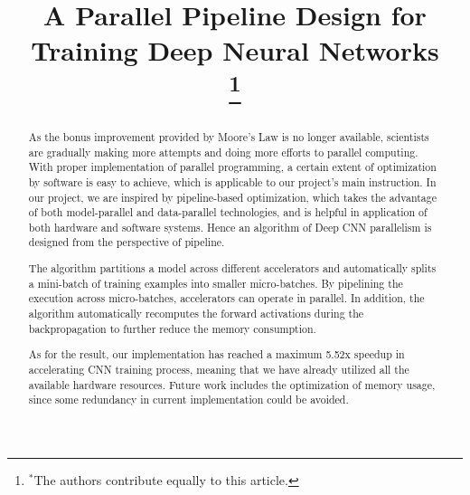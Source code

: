 \documentclass[conference]{IEEEtran}
\begin{document}
\title{A Parallel Pipeline Design for Training Deep Neural Networks\\
\thanks{$^*$The authors contribute equally to this article.}
}

\author{
\and
{}
}

\maketitle

\begin{abstract}
As the bonus improvement provided by Moore’s Law is no longer available, scientists are gradually making more attempts and doing more efforts to parallel computing. With proper implementation of parallel programming, a certain extent of optimization by software is easy to achieve, which is applicable to our project's main instruction. In our project, we are inspired by pipeline-based optimization, which takes the advantage of both model-parallel and data-parallel technologies, and is helpful in application of both hardware and software systems. Hence an algorithm of Deep CNN parallelism is designed from the perspective of pipeline.

The algorithm partitions a model across different accelerators and automatically splits a mini-batch of training examples into smaller micro-batches. By pipelining the execution across micro-batches, accelerators can operate in parallel. In addition, the algorithm automatically recomputes the forward activations during the backpropagation to further reduce the memory consumption.

As for the result, our implementation has reached a maximum 5.52x speedup in accelerating CNN training process, meaning that we have already utilized all the available hardware resources. Future work includes the optimization of memory usage, since some redundancy in current implementation could be avoided.
\end{abstract}
\end{document}
